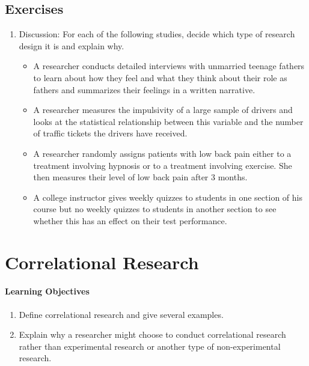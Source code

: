 \subsection{Exercises}
\begin{fullwidth}
\begin{enumerate}
\item  Discussion: For each of the following studies, decide which type of research design it is and explain why.

\begin{itemize}

\item A researcher conducts detailed interviews with unmarried teenage fathers to learn about how they feel and what they think about their role as fathers and summarizes their feelings in a written narrative.

\item A researcher measures the impulsivity of a large sample of drivers and looks at the statistical relationship between this variable and the number of traffic tickets the drivers have received.

\item A researcher randomly assigns patients with low back pain either to a treatment involving hypnosis or to a treatment involving exercise. She then measures their level of low back pain after 3 months.

\item A college instructor gives weekly quizzes to students in one section of his course but no weekly quizzes to students in another section to see whether this has an effect on their test performance.

\end{itemize}
\end{enumerate}
\end{fullwidth}

\newpage
\section{Correlational Research}

\paragraph{Learning Objectives}
 \begin{enumerate}
 \item Define correlational research and give several examples.
 \item Explain why a researcher might choose to conduct correlational research rather than experimental research or another type of non-experimental research.
   \end{enumerate}



